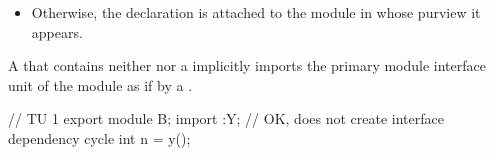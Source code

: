 \begin{std.txt}
\begin{after}
\begin{itemize}
  \item Otherwise, the declaration is
  attached to the module in whose purview it appears.
  \end{itemize}
  \end{after}


  \alinea
\begin{after}\color{addclr}
A 
that contains neither 
nor a 
implicitly imports the primary module interface unit of the module
as if by a .
\begin{example}
\begin{codeblock}
// TU 1
export module B;
import :Y;                      // OK, does not create interface dependency cycle
int n = y();
\end{codeblock}


\end{example}
\end{after}
\end{std.txt}
